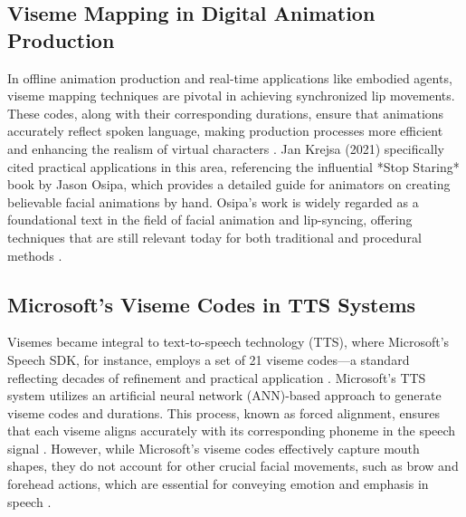 \documentclass[12pt]{article}
\begin{document}

\subsection{Viseme Mapping in Digital Animation Production}
\label{sec:useinprod}
In offline animation production and real-time applications like embodied agents, viseme mapping techniques are pivotal in achieving synchronized lip movements. These codes, along with their corresponding durations, ensure that animations accurately reflect spoken language, making production processes more efficient and enhancing the realism of virtual characters \cite{Osipa2010StopRight}. Jan Krejsa (2021) specifically cited practical applications in this area, referencing the influential *Stop Staring* book by Jason Osipa, which provides a detailed guide for animators on creating believable facial animations by hand. Osipa's work is widely regarded as a foundational text in the field of facial animation and lip-syncing, offering techniques that are still relevant today for both traditional and procedural methods \cite{Krejsa2019, Krejsa2021}.

\subsection{Microsoft's Viseme Codes in TTS Systems}
\label{sec:mstts}
Visemes became integral to text-to-speech technology (TTS), where Microsoft’s Speech SDK, for instance, employs a set of 21 viseme codes—a standard reflecting decades of refinement and practical application \cite{GetLearn}. Microsoft's TTS system utilizes an artificial neural network (ANN)-based approach to generate viseme codes and durations. This process, known as forced alignment, ensures that each viseme aligns accurately with its corresponding phoneme in the speech signal \cite{Xu2013AGames}. However, while Microsoft’s viseme codes effectively capture mouth shapes, they do not account for other crucial facial movements, such as brow and forehead actions, which are essential for conveying emotion and emphasis in speech \cite{Massaro1998PerceivingPrinciple, Massaro2000ReviewPrinciple}.
\end{document}
